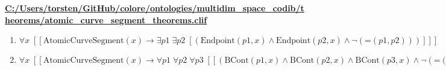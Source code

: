 \documentclass{article}
\begin{document}
\textbf{\url{C:/Users/torsten/GitHub/colore/ontologies/multidim\_space\_codib/theorems/atomic\_curve\_segment\_theorems.clif}}

\begin{enumerate}
\item $\forall x\;  \left[ \left[ \textrm{AtomicCurveSegment}(x) \rightarrow \exists p1\; \exists p2\;  \left[ \left(\textrm{Endpoint}(p1,x) \land \textrm{Endpoint}(p2,x) \land \neg \left(\textrm{=}(p1,p2)\right)\right) \right] \right] \right]$
\item $\forall x\;  \left[ \left[ \textrm{AtomicCurveSegment}(x) \rightarrow \forall p1\; \forall p2\; \forall p3\;  \left[ \left[ \left(\textrm{BCont}(p1,x) \land \textrm{BCont}(p2,x) \land \textrm{BCont}(p3,x) \land \neg \left(\textrm{=}(p1,p2)\right)\right) \rightarrow \left(\textrm{=}(p1,p3) \lor \textrm{=}(p2,p3)\right) \right] \right] \right] \right]$
\end{enumerate}
\end{document}

